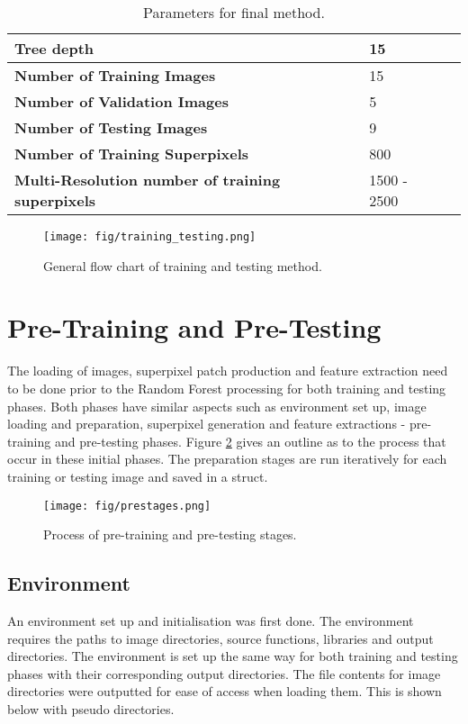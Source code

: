 \begin{table}[H]
\centering
\caption{Parameters for final method.}

\begin{tabular}{|l|l|l|}
\hline
\textbf{Tree depth}	& 15 \\		
\hline
\textbf{Number of Training Images} & 15 \\
\hline
\textbf{Number of Validation Images} & 5\\
\hline		
\textbf{Number of Testing Images} &  9 	\\ 	
\hline
\textbf{Number of Training Superpixels} & 800\\
\hline
\textbf{Multi-Resolution number of training superpixels} & 1500 - 2500\\		
\hline    	 
\end{tabular}
\label{table:finalparameters}
\end{table}

\begin{figure}[H]
\centering
\texttt{[image: fig/training\_testing.png]}
\caption{General flow chart of training and testing method.}
\label{fig:training_testing_flow}
\end{figure}

\section{Pre-Training and Pre-Testing}
\label{sect:pre}
The loading of images, superpixel patch production and feature extraction need to be done prior to the Random Forest processing for both training and testing phases. Both phases have similar aspects such as environment set up, image loading and preparation, superpixel generation and feature extractions - pre-training and pre-testing phases. Figure \ref{fig:prestages} gives an outline as to the process that occur in these initial phases. The preparation stages are run iteratively for each training or testing image and saved in a struct.

\begin{figure}[H]
\centering
\texttt{[image: fig/prestages.png]}
\caption{Process of pre-training and pre-testing stages.}
\label{fig:prestages}
\end{figure}

\subsection{Environment}
An environment set up and initialisation was first done. The environment requires the paths to image directories, source functions, libraries and output directories. The environment is set up the same way for both training and testing phases with their corresponding output directories. The file contents for image directories were outputted for ease of access when loading them.  This is shown below with pseudo directories.

